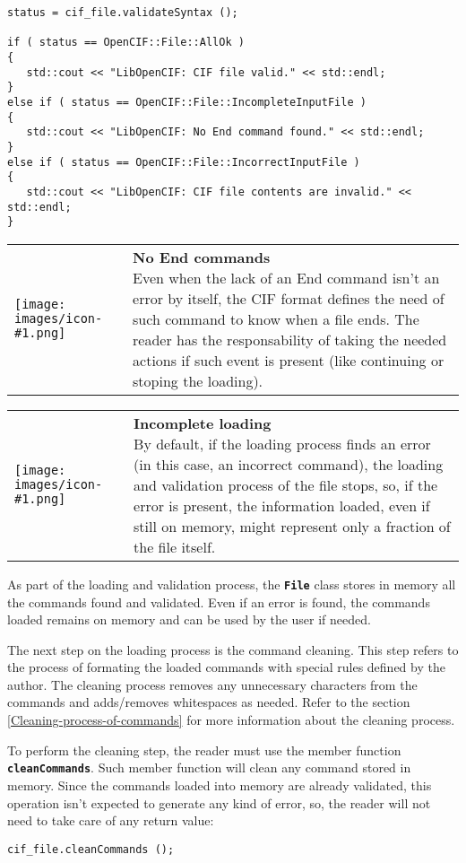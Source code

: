 \documentclass[11pt,twoside,openany,x11names,svgnames]{memoir}
\makeatletter
\newcommand{\IconNote}[3]
{
	\begin{table}[ht]
	\begin{tabular}{ lm{\dimexpr\textwidth-8\tabcolsep-\wd0}@{}}
		\toprule
		\texttt{[image: images/icon-\#1.png]}
		&
		\parbox[t]{155mm}{
		\textbf{#2} \\
		#3
		}
	\end{tabular}
\end{table}
}
\makeatother
\begin{document}
\begin{lstlisting}[frame=single,style=CPPStyle]
status = cif_file.validateSyntax ();
   
if ( status == OpenCIF::File::AllOk )
{
   std::cout << "LibOpenCIF: CIF file valid." << std::endl;
}
else if ( status == OpenCIF::File::IncompleteInputFile )
{
   std::cout << "LibOpenCIF: No End command found." << std::endl;
}
else if ( status == OpenCIF::File::IncorrectInputFile )
{
   std::cout << "LibOpenCIF: CIF file contents are invalid." << std::endl;
}
\end{lstlisting}

\IconNote
	{warning}
	{No End commands}
	{Even when the lack of an End command isn't an error by itself, the CIF format defines the need of such command to know when a file ends. The reader has the responsability of taking the needed actions if such event is present (like continuing or stoping the loading).}
	
\IconNote
	{warning}
	{Incomplete loading}
	{By default, if the loading process finds an error (in this case, an incorrect command), the loading and validation process of the file stops, so, if the error is present, the information loaded, even if still on memory, might represent only a fraction of the file itself.}
	
As part of the loading and validation process, the \textbf{\texttt{File}} class stores in memory all the commands found and validated. Even if an error is found, the commands loaded remains on memory and can be used by the user if needed.

The next step on the loading process is the command cleaning. This step refers to the process of formating the loaded commands with special rules defined by the author. The cleaning process removes any unnecessary characters from the commands and adds/removes whitespaces as needed. Refer to the section \ref{Cleaning-process-of-commands} for more information about the cleaning process.

To perform the cleaning step, the reader must use the member function \textbf{\texttt{cleanCommands}}. Such member function will clean any command stored in memory. Since the commands loaded into memory are already validated, this operation isn't expected to generate any kind of error, so, the reader will not need to take care of any return value:

\begin{lstlisting}[frame=single,style=CPPStyle]
cif_file.cleanCommands ();
\end{lstlisting}
\end{document}
